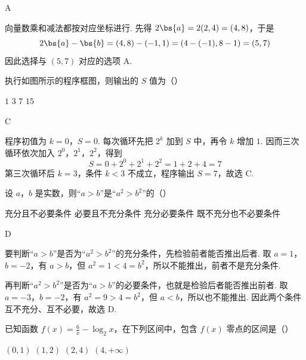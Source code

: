 \begin{answer}
A
\end{answer}

\begin{solution}
向量数乘和减法都按对应坐标进行. 先得 \(2\bs{a}=2(2,4)=(4,8)\)，于是
\[
2\bs{a}-\bs{b}=(4,8)-(-1,1)=(4-(-1),8-1)=(5,7)
\]
因此选择与 \((5,7)\) 对应的选项 A.
\end{solution}

\begin{problem}
执行如图所示的程序框图，则输出的 \(S\) 值为（\quad）


\choices
    {\(1\)}
    {\(3\)}
    {\(7\)}
    {\(15\)}
\end{problem}

\begin{answer}
C
\end{answer}

\begin{solution}
程序初值为 \(k=0\)，\(S=0\). 每次循环先把 \(2^k\) 加到 \(S\) 中，再令 \(k\) 增加 \(1\). 因而三次循环依次加入 \(2^0\)，\(2^1\)，\(2^2\)，得到
\[
S=0+2^0+2^1+2^2=1+2+4=7
\]
第三次循环后 \(k=3\)，条件 \(k<3\) 不成立，程序输出 \(S=7\)，故选 C.
\end{solution}

\begin{problem}
设 \(a\)，\(b\) 是实数，则“\(a > b\)”是“\(a^2 > b^2\)”的（\quad）

\choices
    {充分且不必要条件}
    {必要且不充分条件}
    {充分必要条件}
    {既不充分也不必要条件}
\end{problem}

\begin{answer}
D
\end{answer}

\begin{solution}
要判断“\(a>b\)”是否为“\(a^2>b^2\)”的充分条件，先检验前者能否推出后者. 取 \(a=1\)，\(b=-2\)，有 \(a>b\)，但 \(a^2=1<4=b^2\)，所以不能推出，前者不是充分条件.

再判断“\(a^2>b^2\)”是否为“\(a>b\)”的必要条件，也就是检验后者能否推出前者. 取 \(a=-3\)，\(b=-2\)，有 \(a^2=9>4=b^2\)，但 \(a<b\)，所以也不能推出. 因此两个条件互不充分、互不必要，故选 D.
\end{solution}

\begin{problem}
已知函数 \( f(x) = \frac{6}{x} - \log_2 x \)，在下列区间中，包含 \( f(x) \) 零点的区间是（\quad）

\choices
    {\(\left(0,1\right)\)}
    {\(\left(1,2\right)\)}
    {\(\left(2,4\right)\)}
    {\(\left(4,+\infty\right)\)}
\end{problem}

